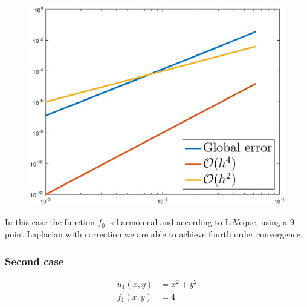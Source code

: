 \documentclass[main.tex]{subfiles}
\begin{document}
\begin{figure}[h]
\begin{minipage}{.3\textwidth}
  \centering
  \includegraphics[width=.9\linewidth]{../Figures/ex2u0err}
  \label{fig:ex2:u0err}
\end{minipage}
\end{figure}

In this case the function $f_0$ is harmonical and according to LeVeque, using a 9-point Laplacian with correction we are able to achieve fourth order convergence.

\subsubsection*{Second case}
\begin{align}
    u_{1}(x,y) &= x^2 + y^2 \\
    f_1(x,y) &= 4
\end{align}
\end{document}
